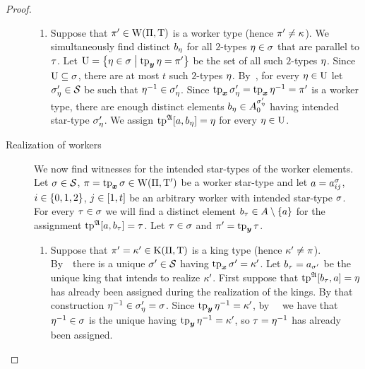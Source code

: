 \begin{proof}
\begin{description}
\begin{enumerate}
  \item
  Suppose that ${\pi'} \in \mathrm{W}(\Pi,\mathrm{T})$ is a worker type (hence ${\pi'} \neq
  \kappa$).
  We simultaneously find distinct $b_{\eta}$ for all $2$-types $\eta \in
  \sigma$ that are parallel to $\tau$.
  Let $\mathrm{U} = \left\{\eta\in \sigma\mathrel{}\middle|\mathrel{}\operatorname{tp}_{\bm{y}}\eta = {\pi'}\right\}$ be the set of all
  such $2$-types $\eta$.
  Since $\mathrm{U} \subseteq \sigma$, there are at most $t$ such $2$-types $\eta$.
  By~, for every $\eta \in \mathrm{U}$ let $\sigma'_\eta \in \mathcal{S}$ be
  such that $\eta^{-1} \in \sigma'_\eta$.
  Since $\operatorname{tp}_{\bm{x}}{\sigma_{\eta}'} = \operatorname{tp}_{\bm{x}}\eta^{-1} = {\pi'}$ is a worker type, there
  are enough distinct elements $b_{\eta} \in A^{{\sigma_{\eta}'}}_{0}$ having
  intended star-type ${\sigma_{\eta}'}$.
  We assign $\operatorname{tp}^{\mathfrak{A}}[a,b_{\eta}] = \eta$ for every $\eta \in \mathrm{U}$.
  \end{enumerate}
  \item[Realization of workers]
  We now find witnesses for the intended star-types of the worker elements.
  Let $\sigma \in \mathcal{S}$, $\pi = \operatorname{tp}_{\bm{x}}\sigma \in \mathrm{W}(\Pi,{\mathrm{T}'})$ be a worker
  star-type 
  and let $a = a^{\sigma}_{i j}$, $i \in \left\{0,1,2\right\}$, $j \in [1,t]$ be
  an arbitrary worker with intended star-type $\sigma$.
  For every $\tau \in \sigma$ we will find a distinct element $b_{\tau} \in
  A \setminus \left\{a\right\}$ for the assignment $\operatorname{tp}^{\mathfrak{A}}[a,b_{\tau}] = \tau$.
  Let $\tau \in \sigma$ and ${\pi'} = \operatorname{tp}_{\bm{y}}\tau$.
  \begin{enumerate}
    \item 
    Suppose that ${\pi'} = {\kappa'} \in \mathrm{K}(\Pi,\mathrm{T})$ is a king type (hence
    ${\kappa'} \neq \pi$). By~~there is a unique ${\sigma'} \in \mathcal{S}$
    having $\operatorname{tp}_{\bm{x}}{\sigma'} = {\kappa'}$.
    Let $b_{\tau} = a_{{\sigma'}}$ be the unique king that intends to realize
    ${\kappa'}$. 
    First suppose that $\operatorname{tp}^{\mathfrak{A}}[b_{\tau},a] = \eta$ has already
    been assigned during the realization of the kings. By that construction
    $\eta^{-1} \in \sigma'_\eta = \sigma$. Since $\operatorname{tp}_{\bm{y}}\eta^{-1} = {\kappa'}$,
    by~~ we have that $\eta^{-1} \in \sigma$ is the unique having
    $\operatorname{tp}_{\bm{y}}\eta^{-1} = {\kappa'}$, so $\tau = \eta^{-1}$ has already been
    assigned.
    

\end{enumerate}
\end{description}
\end{proof}
